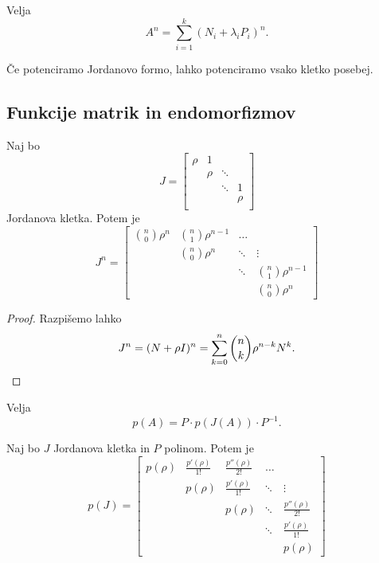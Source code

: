 \documentclass[12pt, a4paper]{article}
\begin{document}
\obvs

\begin{trditev}
Velja
\[
A^n=\sum_{i=1}^k \left(N_i+\lambda_iP_i\right)^n.
\]
\end{trditev}

\obvs

\begin{posledica}
Če potenciramo Jordanovo formo, lahko potenciramo vsako kletko posebej.
\end{posledica}

\newpage

\subsection{Funkcije matrik in endomorfizmov}

\begin{trditev}
Naj bo
\[
J=\begin{bmatrix}
\rho & 1    &        &      \\ 
     & \rho & \ddots &      \\ 
     &      & \ddots & 1    \\ 
     &      &        & \rho \\ 
\end{bmatrix} 
\]
Jordanova kletka. Potem je
\[
J^n=\begin{bmatrix}
\binom{n}{0}\rho^n & \binom{n}{1}\rho^{n-1} & \dots & \\ 
& \binom{n}{0}\rho^n & \ddots & \vdots \\ 
& & \ddots & \binom{n}{1}\rho^{n-1} \\ 
& & & \binom{n}{0}\rho^n
\end{bmatrix} 
\]
\end{trditev}

\begin{proof}
Razpišemo lahko
\[
J^n=(N+\rho I)^n=\sum_{k=0}^n\binom{n}{k}\rho^{n-k}N^k.\qedhere
\]
\end{proof}

\begin{posledica}
Velja
\[
p(A)=P\cdot p(J(A))\cdot P^{-1}.
\]
\end{posledica}

\begin{trditev}
Naj bo $J$ Jordanova kletka in $P$ polinom. Potem je
\[
p(J)=\begin{bmatrix}
p(\rho) & \frac{p'(\rho)}{1!} & \frac{p''(\rho)}{2!} & \dots & \\ 
& p(\rho) & \frac{p'(\rho)}{1!} & \ddots & \vdots \\ 
& & p(\rho) & \ddots & \frac{p''(\rho)}{2!} \\ 
& & & \ddots & \frac{p'(\rho)}{1!} \\ 
& & & & p(\rho)
\end{bmatrix} 
\]
\end{trditev}
\end{document}
